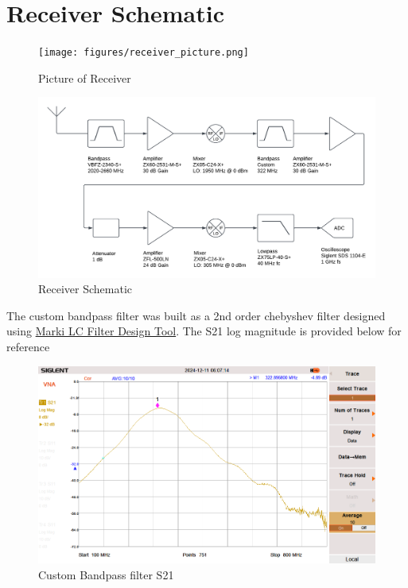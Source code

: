 \documentclass[letterpaper,12pt]{article}
\begin{document}
\newpage
\section{Receiver Schematic}
\begin{figure}[H]
	\begin{centering}
		\texttt{[image: figures/receiver\_picture.png]}
		\caption{Picture of Receiver}
	\end{centering}
\end{figure}

\begin{figure}[H]
	\begin{centering}
		\includegraphics[width=1\columnwidth]{figures/receiver_schematic.pdf}
		\caption{Receiver Schematic}
	\end{centering}
\end{figure}

The custom bandpass filter was built as a 2nd order chebyshev filter designed using \href{https://markimicrowave.com/technical-resources/tools/lc-filter-design-tool/}{Marki LC Filter Design Tool}. The S21 log magnitude is provided below for reference
\begin{figure}[H]
	\begin{centering}
		\includegraphics[width=1\columnwidth]{figures/bpf_s21.png}
		\caption{Custom Bandpass filter S21}
	\end{centering}
\end{figure}
\end{document}
